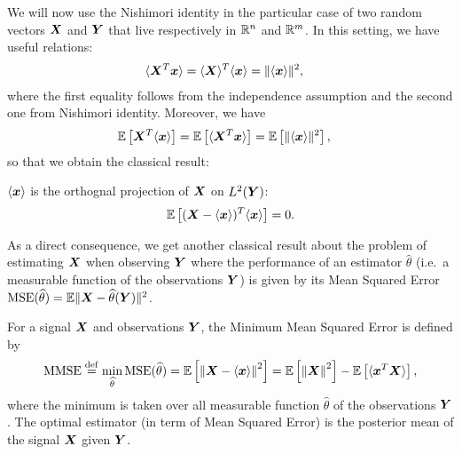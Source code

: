 \documentclass[12pt,nocut]{article}
\begin{document}
We will now use the Nishimori identity in the particular case of two random vectors ${\boldsymbol X}$ and ${\boldsymbol Y}$ that live respectively in $\mathbb{R}^n$ and $\mathbb{R}^m$.
In this setting, we have useful relations:
\begin{align*}
\langle {\boldsymbol X}^T {\boldsymbol x} \rangle &=  \langle {\boldsymbol X} \rangle^T \langle {\boldsymbol x} \rangle =\| \langle {\boldsymbol x} \rangle\|^2,
\end{align*}
where the first equality follows from the independence assumption and the second one from Nishimori identity. Moreover, we have
\begin{align*}
\mathbb{E} \left[ {\boldsymbol X}^T \langle {\boldsymbol x} \rangle \right] &=  \mathbb{E} \left[\langle {\boldsymbol X}^T {\boldsymbol x} \rangle\right] = \mathbb{E} \left[\| \langle {\boldsymbol x} \rangle\|^2 \right],
\end{align*}
so that we obtain the classical result:
\begin{proposition}\label{prop:proj}
$\langle {\boldsymbol x} \rangle$ is the orthognal projection of ${\boldsymbol X}$ on $L^2({\boldsymbol Y})$:
\begin{align*}
\mathbb{E} \left[ ({\boldsymbol X}- \langle {\boldsymbol x} \rangle)^T \langle {\boldsymbol x} \rangle \right] = 0.
\end{align*}
\end{proposition}
As a direct consequence, we get another classical result about the problem of estimating ${\boldsymbol X}$ when observing ${\boldsymbol Y}$ where
the performance of an estimator $\widehat{\theta}$ (i.e.\ a measurable function of the observations ${\boldsymbol Y}$) is given by its Mean Squared Error ${{\rm MSE}}(\widehat{\theta}) = \mathbb{E} \| {\boldsymbol X} - \widehat{\theta}({\boldsymbol Y}) \|^2$.
\begin{definition}\label{def:MMSE}
For a signal ${\boldsymbol X}$ and observations ${\boldsymbol Y}$, the Minimum Mean Squared Error is defined by
$$
{{\rm MMSE}} \overset{{\rm def}}{=} \min_{\widehat{\theta}} {{\rm MSE}}(\widehat{\theta})= \mathbb{E} \left[ \left\| {\boldsymbol X} - \langle {\boldsymbol x} \rangle \right\|^2 \right] = \mathbb{E} \left[\left\| {\boldsymbol X} \right\|^2 \right]- \mathbb{E}\left[\langle {\boldsymbol x}^T{\boldsymbol X}\rangle \right],
$$
where the minimum is taken over all measurable function $\widehat{\theta}$ of the observations ${\boldsymbol Y}$. 
The optimal estimator (in term of Mean Squared Error) is the posterior mean of the signal ${\boldsymbol X}$ given ${\boldsymbol Y}$.
\end{definition}
\end{document}
